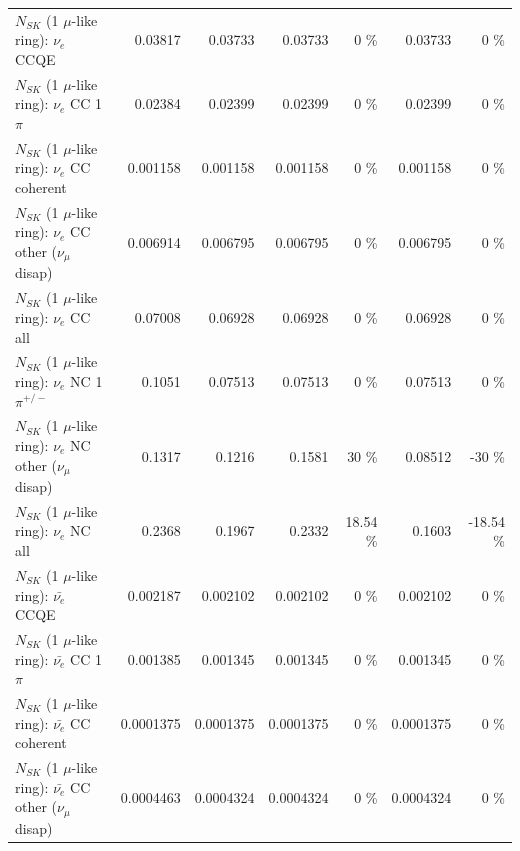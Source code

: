 \begin{table}
\begin{tabular}{| l | r | r | r  r | r  r |}
\hline
\hline
\hline
                                      $N_{SK}$ (1 $\mu$-like ring): $\nu_e$ CCQE &         0.03817 &         0.03733 &         0.03733 &        0 \%  &         0.03733 &        0 \%  \\ 
                                 $N_{SK}$ (1 $\mu$-like ring): $\nu_e$ CC 1$\pi$ &         0.02384 &         0.02399 &         0.02399 &        0 \%  &         0.02399 &        0 \%  \\ 
                               $N_{SK}$ (1 $\mu$-like ring): $\nu_e$ CC coherent &        0.001158 &        0.001158 &        0.001158 &        0 \%  &        0.001158 &        0 \%  \\ 
                $N_{SK}$ (1 $\mu$-like ring): $\nu_e$ CC other ($\nu_\mu$ disap) &        0.006914 &        0.006795 &        0.006795 &        0 \%  &        0.006795 &        0 \%  \\ 
                                  $N_{SK}$ (1 $\mu$-like ring): $\nu_{e}$ CC all &         0.07008 &         0.06928 &         0.06928 &        0 \%  &         0.06928 &        0 \%  \\ 
\hline
                           $N_{SK}$ (1 $\mu$-like ring): $\nu_e$ NC 1$\pi^{+/-}$ &          0.1051 &         0.07513 &         0.07513 &        0 \%  &         0.07513 &        0 \%  \\ 
                $N_{SK}$ (1 $\mu$-like ring): $\nu_e$ NC other ($\nu_\mu$ disap) &          0.1317 &          0.1216 &          0.1581 &       30 \%  &         0.08512 &      -30 \%  \\ 
                                  $N_{SK}$ (1 $\mu$-like ring): $\nu_{e}$ NC all &          0.2368 &          0.1967 &          0.2332 &    18.54 \%  &          0.1603 &   -18.54 \%  \\ 
\hline
\hline
\hline
                                $N_{SK}$ (1 $\mu$-like ring): $\bar{\nu_e}$ CCQE &        0.002187 &        0.002102 &        0.002102 &        0 \%  &        0.002102 &        0 \%  \\ 
                           $N_{SK}$ (1 $\mu$-like ring): $\bar{\nu_e}$ CC 1$\pi$ &        0.001385 &        0.001345 &        0.001345 &        0 \%  &        0.001345 &        0 \%  \\ 
                         $N_{SK}$ (1 $\mu$-like ring): $\bar{\nu_e}$ CC coherent &       0.0001375 &       0.0001375 &       0.0001375 &        0 \%  &       0.0001375 &        0 \%  \\ 
          $N_{SK}$ (1 $\mu$-like ring): $\bar{\nu_e}$ CC other ($\nu_\mu$ disap) &       0.0004463 &       0.0004324 &       0.0004324 &        0 \%  &       0.0004324 &        0 \%  \\ 

\end{tabular}
\end{table}
